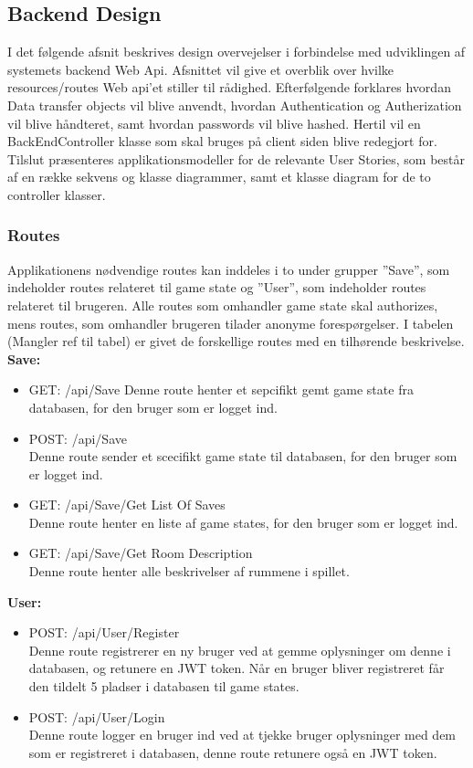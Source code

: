 \subsection{Backend Design}

I det følgende afsnit beskrives design overvejelser i forbindelse med udviklingen af systemets backend Web Api. Afsnittet vil give et overblik over hvilke resources/routes Web api’et stiller til rådighed. Efterfølgende forklares hvordan Data transfer objects vil blive anvendt, hvordan Authentication og Autherization vil blive håndteret, samt hvordan passwords vil blive hashed. Hertil vil en BackEndController klasse som skal bruges på client siden blive redegjort for. Tilslut præsenteres applikationsmodeller for de relevante User Stories, som består af en række sekvens og klasse diagrammer, samt et klasse diagram for de to controller klasser.\\

\subsubsection{Routes}
Applikationens nødvendige routes kan inddeles i to under grupper ”Save”, som indeholder routes relateret til game state og ”User”, som indeholder routes relateret til brugeren. Alle routes som omhandler game state skal authorizes, mens routes, som omhandler brugeren tilader anonyme forespørgelser. I tabelen (Mangler ref til tabel) er givet de forskellige routes med en tilhørende beskrivelse.\\

\textbf{Save:}\\
\begin{itemize}
\item GET: /api/Save
Denne route henter et sepcifikt gemt game state fra databasen, for den bruger som er logget ind.
\item POST: /api/Save\\
Denne route sender et scecifikt game state til databasen, for den bruger som er logget ind.
\item GET: /api/Save/Get List Of Saves\\
Denne route henter en liste af game states, for den bruger som er logget ind. 
\item GET: /api/Save/Get Room Description\\
Denne route henter alle beskrivelser af rummene i spillet.
\end{itemize}

\textbf{User:}\\
\begin{itemize}
\item POST: /api/User/Register\\
Denne route registrerer en ny bruger ved at gemme oplysninger om denne i databasen, og retunere en JWT token. Når en bruger bliver registreret får den tildelt 5 pladser i databasen til game states.
\item POST: /api/User/Login\\
Denne route logger en bruger ind ved at tjekke bruger oplysninger med dem som er registreret i databasen, denne route retunere også en JWT token.
\end{itemize}

